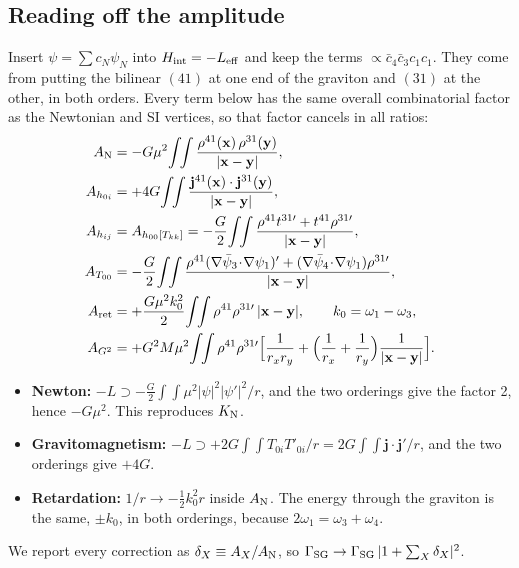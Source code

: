 \documentclass[11pt]{article}
\newcommand{\bx}{\mathbf{x}}\newcommand{\by}{\mathbf{y}}\newcommand{\bv}{\mathbf{v}}
\newcommand{\bj}{\mathbf{j}}\newcommand{\bA}{\mathbf{A}}\newcommand{\bn}{\mathbf{n}}
\begin{document}
\subsection{Reading off the amplitude}
\begin{center}
\end{center}
Insert $\psi=\sum c_N\psi_N$ into $H_{\rm int}=-L_{\rm eff}$ and keep the terms $\propto\bar c_4\bar c_3c_1c_1$. They come from putting the bilinear $(41)$ at one end of the graviton and $(31)$ at the other, in both orders. Every term below has the same overall combinatorial factor as the Newtonian and SI vertices, so that factor cancels in all ratios:
\begin{align}
A_{\rm N}&=-G\mu^2\!\int\!\!\int\frac{\rho^{41}(\bx)\,\rho^{31}(\by)}{|\bx-\by|}, \label{eq:AN}\\
A_{h_{0i}}&=+4G\!\int\!\!\int\frac{\bj^{41}(\bx)\cdot\bj^{31}(\by)}{|\bx-\by|},\label{eq:AGM}\\
A_{h_{ij}}&=A_{h_{00}[T_{kk}]}=-\frac G2\!\int\!\!\int\frac{\rho^{41}t^{31\prime}+t^{41}\rho^{31\prime}}{|\bx-\by|},\label{eq:Ahij}\\
A_{T_{00}}&=-\frac G2\!\int\!\!\int\frac{\rho^{41}(\nabla\bar\psi_3\!\cdot\!\nabla\psi_1)'+(\nabla\bar\psi_4\!\cdot\!\nabla\psi_1)\rho^{31\prime}}{|\bx-\by|},\\
A_{\rm ret}&=+\frac{G\mu^2k_0^2}{2}\!\int\!\!\int\rho^{41}\rho^{31\prime}\,|\bx-\by|,\qquad k_0=\omega_1-\omega_3,\\
A_{G^2}&=+G^2M\mu^2\!\int\!\!\int\rho^{41}\rho^{31\prime}\Big[\frac1{r_xr_y}+\Big(\frac1{r_x}+\frac1{r_y}\Big)\frac1{|\bx-\by|}\Big].
\end{align}
\begin{verify}
\begin{itemize}[nosep]
\item \textbf{Newton:} $-L\supset-\tfrac G2\int\!\!\int\mu^2|\psi|^2|\psi'|^2/r$, and the two orderings give the factor 2, hence $-G\mu^2$. This reproduces $K_{\rm N}$.
\item \textbf{Gravitomagnetism:} $-L\supset+2G\int\!\!\int T_{0i}T'_{0i}/r=2G\int\!\!\int\bj\cdot\bj'/r$, and the two orderings give $+4G$.
\item \textbf{Retardation:} $1/r\to-\tfrac12k_0^2r$ inside $A_{\rm N}$. The energy through the graviton is the same, $\pm k_0$, in both orderings, because $2\omega_1=\omega_3+\omega_4$.
\end{itemize}
\end{verify}
We report every correction as $\delta_X\equiv A_X/A_{\rm N}$, so $\Gamma_{\rm SG}\to\Gamma_{\rm SG}\,|1+\sum_X\delta_X|^2$.
\end{document}
